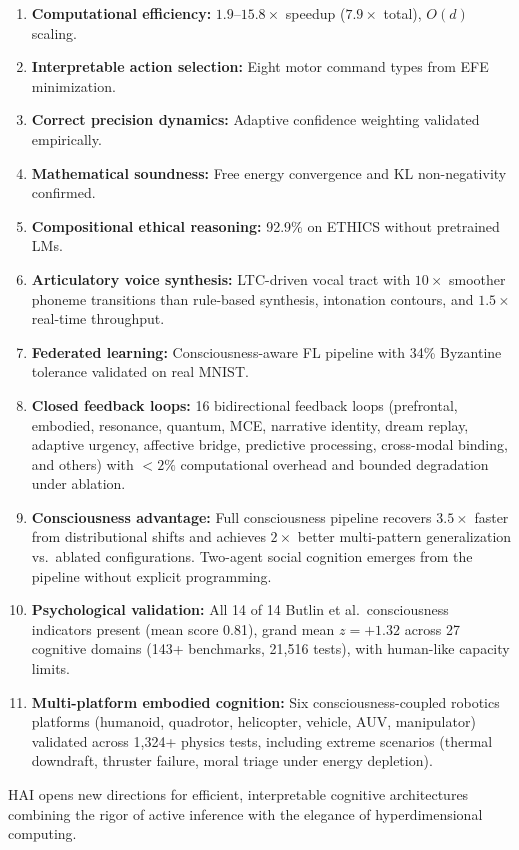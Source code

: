 \documentclass[10pt,letterpaper]{article}
\begin{document}
\begin{enumerate}[nosep]
  \item \textbf{Computational efficiency:} $1.9$--$15.8\times$ speedup ($7.9\times$ total), $O(d)$ scaling.
  \item \textbf{Interpretable action selection:} Eight motor command types from EFE minimization.
  \item \textbf{Correct precision dynamics:} Adaptive confidence weighting validated empirically.
  \item \textbf{Mathematical soundness:} Free energy convergence and KL non-negativity confirmed.
  \item \textbf{Compositional ethical reasoning:} 92.9\% on ETHICS without pretrained LMs.
  \item \textbf{Articulatory voice synthesis:} LTC-driven vocal tract with $10{\times}$ smoother phoneme transitions than rule-based synthesis, intonation contours, and $1.5{\times}$ real-time throughput.
  \item \textbf{Federated learning:} Consciousness-aware FL pipeline with 34\% Byzantine tolerance validated on real MNIST.
  \item \textbf{Closed feedback loops:} 16 bidirectional feedback loops (prefrontal, embodied, resonance, quantum, MCE, narrative identity, dream replay, adaptive urgency, affective bridge, predictive processing, cross-modal binding, and others) with $<2\%$ computational overhead and bounded degradation under ablation.
  \item \textbf{Consciousness advantage:} Full consciousness pipeline recovers $3.5\times$ faster from distributional shifts and achieves $2\times$ better multi-pattern generalization vs.\ ablated configurations. Two-agent social cognition emerges from the pipeline without explicit programming.
  \item \textbf{Psychological validation:} All 14 of 14 Butlin et al.\ consciousness indicators present (mean score 0.81), grand mean $z = +1.32$ across 27 cognitive domains (143+ benchmarks, 21{,}516 tests), with human-like capacity limits.
  \item \textbf{Multi-platform embodied cognition:} Six consciousness-coupled robotics platforms (humanoid, quadrotor, helicopter, vehicle, AUV, manipulator) validated across 1{,}324+ physics tests, including extreme scenarios (thermal downdraft, thruster failure, moral triage under energy depletion).
\end{enumerate}

HAI opens new directions for efficient, interpretable cognitive architectures combining the rigor of active inference with the elegance of hyperdimensional computing.
\end{document}
